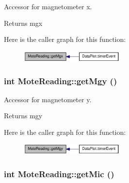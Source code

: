 Accessor for magnetometer x. 

\begin{DoxyReturn}{Returns}
mgx 
\end{DoxyReturn}


Here is the caller graph for this function:\nopagebreak
\begin{figure}[H]
\begin{center}
\leavevmode
\includegraphics[width=149pt]{classMoteReading_a318b7e6afba062ee3df207495070e277_icgraph}
\end{center}
\end{figure}


\hypertarget{classMoteReading_a4344f67449dbd79febac0c4795b185f4}{
\subsubsection[{getMgy}]{\setlength{\rightskip}{0pt plus 5cm}int MoteReading::getMgy ()}}
\label{classMoteReading_a4344f67449dbd79febac0c4795b185f4}


Accessor for magnetometer y. 

\begin{DoxyReturn}{Returns}
mgy 
\end{DoxyReturn}


Here is the caller graph for this function:\nopagebreak
\begin{figure}[H]
\begin{center}
\leavevmode
\includegraphics[width=149pt]{classMoteReading_a4344f67449dbd79febac0c4795b185f4_icgraph}
\end{center}
\end{figure}


\hypertarget{classMoteReading_a348cb45f4613499385a354fe6857ef5d}{
\subsubsection[{getMic}]{\setlength{\rightskip}{0pt plus 5cm}int MoteReading::getMic ()}}
\label{classMoteReading_a348cb45f4613499385a354fe6857ef5d}



